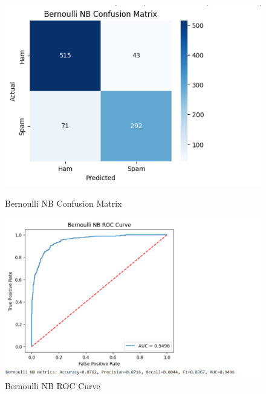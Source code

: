 \documentclass[12pt]{article}
\begin{document}
\begin{figure}[H]
\centering
\begin{minipage}{0.45\textwidth}
\centering
\includegraphics[width=\linewidth]{10.png}
\caption{Bernoulli NB Confusion Matrix}
\end{minipage}
\hfill
\begin{minipage}{0.45\textwidth}
\centering
\includegraphics[width=\linewidth]{11.png}
\caption{Bernoulli NB ROC Curve}
\end{minipage}
\end{figure}
\end{document}
